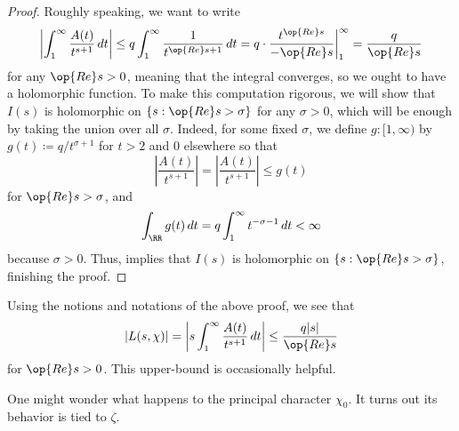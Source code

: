 \documentclass[../notes.tex]{subfiles}
\begin{document}
\begin{proof}
	Roughly speaking, we want to write
	\[\left|\int_1^\infty\frac{A(t)}{t^{s+1}}\,dt\right|\le q\int_1^\infty\frac1{t^{\op{Re}s+1}}\,dt=q\cdot\frac{t^{\op{Re}s}}{-\op{Re}s}\bigg|_1^\infty=\frac q{\op{Re}s}\]
	for any $\op{Re}s>0$, meaning that the integral converges, so we ought to have a holomorphic function. To make this computation rigorous, we will show that $I(s)$ is holomorphic on $\{s:\op{Re}s>\sigma\}$ for any $\sigma>0$, which will be enough by taking the union over all $\sigma$. Indeed, for some fixed $\sigma$, we define $g\colon[1,\infty)$ by $g(t)\coloneqq q/t^{\sigma+1}$ for $t>2$ and $0$ elsewhere so that
	\[\left|\frac{A(t)}{t^{s+1}}\right|=\left|\frac{A(t)}{t^{s+1}}\right|\le g(t)\]
	for $\op{Re}s>\sigma$, and
	\[\int_\RR g(t)\,dt=q\int_1^\infty t^{-\sigma-1}\,dt<\infty\]
	because $\sigma>0$. Thus,  implies that $I(s)$ is holomorphic on $\{s:\op{Re}s>\sigma\}$, finishing the proof.
\end{proof}
\begin{remark} \label{rem:bound-l-chi}
	Using the notions and notations of the above proof, we see that
	\[|L(s,\chi)|=\left|s\int_1^\infty\frac{A(t)}{t^{s+1}}\,dt\right|\le\frac{q|s|}{\op{Re}s}\]
	for $\op{Re}s>0$. This upper-bound is occasionally helpful.
\end{remark}
One might wonder what happens to the principal character $\chi_0$. It turns out its behavior is tied to $\zeta$.
\end{document}
